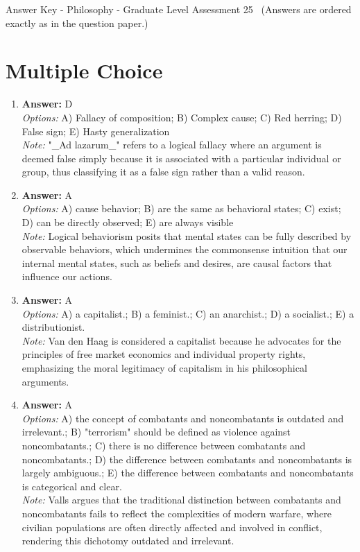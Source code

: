 \documentclass[12pt]{article}
\begin{document}
\begin{center}
Answer Key - Philosophy - Graduate Level Assessment 25 \
\small (Answers are ordered exactly as in the question paper.)
\end{center}

\section*{Multiple Choice}
\begin{enumerate}[label=\arabic*.]
\item \textbf{Answer:} D
\\ \textit{Options:} A) Fallacy of composition; B) Complex cause; C) Red herring; D) False sign; E) Hasty generalization
\\ \textit{Note:} "\_Ad lazarum\_" refers to a logical fallacy where an argument is deemed false simply because it is associated with a particular individual or group, thus classifying it as a false sign rather than a valid reason.
\item \textbf{Answer:} A
\\ \textit{Options:} A) cause behavior; B) are the same as behavioral states; C) exist; D) can be directly observed; E) are always visible
\\ \textit{Note:} Logical behaviorism posits that mental states can be fully described by observable behaviors, which undermines the commonsense intuition that our internal mental states, such as beliefs and desires, are causal factors that influence our actions.
\item \textbf{Answer:} A
\\ \textit{Options:} A) a capitalist.; B) a feminist.; C) an anarchist.; D) a socialist.; E) a distributionist.
\\ \textit{Note:} Van den Haag is considered a capitalist because he advocates for the principles of free market economics and individual property rights, emphasizing the moral legitimacy of capitalism in his philosophical arguments.
\item \textbf{Answer:} A
\\ \textit{Options:} A) the concept of combatants and noncombatants is outdated and irrelevant.; B) "terrorism" should be defined as violence against noncombatants.; C) there is no difference between combatants and noncombatants.; D) the difference between combatants and noncombatants is largely ambiguous.; E) the difference between combatants and noncombatants is categorical and clear.
\\ \textit{Note:} Valls argues that the traditional distinction between combatants and noncombatants fails to reflect the complexities of modern warfare, where civilian populations are often directly affected and involved in conflict, rendering this dichotomy outdated and irrelevant.

\end{enumerate}
\end{document}
